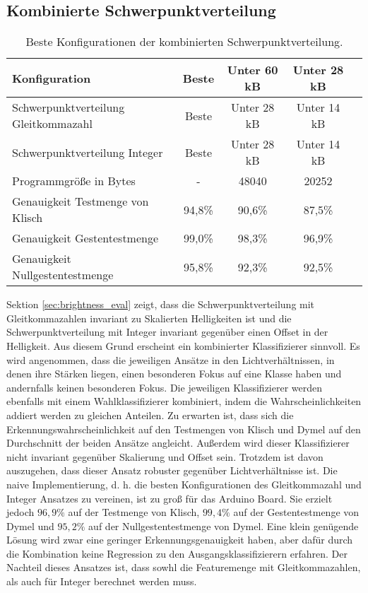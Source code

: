 \subsection{Kombinierte Schwerpunktverteilung}
\begin{table}[h!]
    \centering
    \begin{tabular}{ | l | c | c | c | c |}
        \hline
        Konfiguration & Beste & Unter 60 kB & Unter 28 kB \\\hline
        Schwerpunktverteilung Gleitkommazahl & Beste & Unter 28 kB & Unter 14 kB \\\hline
        Schwerpunktverteilung Integer & Beste &  Unter 28 kB & Unter 14 kB \\\hline
        Programmgröße in Bytes & - & 48040 & 20252 \\\hline
        Genauigkeit Testmenge von Klisch & 94,8\% & 90,6\% & 87,5\% \\\hline
        Genauigkeit Gestentestmenge & 99,0\% & 98,3\% & 96,9\% \\\hline
        Genauigkeit Nullgestentestmenge & 95,8\% & 92,3\% & 92,5\% \\\hline
    \end{tabular}
    \caption{Beste Konfigurationen der kombinierten Schwerpunktverteilung.}
    \label{tab:schwerpunktverteilung_int_and_float}
\end{table}
Sektion \ref{sec:brightness_eval} zeigt, dass die Schwerpunktverteilung mit Gleitkommazahlen invariant zu Skalierten Helligkeiten ist und die Schwerpunktverteilung mit Integer invariant
gegenüber einen Offset in der Helligkeit. Aus diesem Grund erscheint ein kombinierter Klassifizierer sinnvoll. Es wird angenommen, dass die jeweiligen Ansätze in den Lichtverhältnissen, in denen ihre
Stärken liegen, einen besonderen Fokus auf eine Klasse haben und andernfalls keinen besonderen Fokus.
\newline
\newline
Die jeweiligen Klassifizierer werden ebenfalls mit einem Wahlklassifizierer kombiniert, indem die Wahrscheinlichkeiten addiert werden zu gleichen Anteilen. Zu erwarten ist, dass sich die
Erkennungswahrscheinlichkeit auf den Testmengen von Klisch und Dymel auf den Durchschnitt der beiden Ansätze angleicht.
Außerdem wird dieser Klassifizierer nicht invariant gegenüber Skalierung und Offset sein. Trotzdem ist davon auszugehen, dass dieser Ansatz robuster gegenüber Lichtverhältnisse ist.
\newline
\newline
Die naive Implementierung, d. h. die besten Konfigurationen des Gleitkommazahl und Integer Ansatzes zu vereinen, ist zu groß für das Arduino Board. Sie erzielt jedoch $96,9\%$ auf der Testmenge
von Klisch, $99,4\%$ auf der Gestentestmenge von Dymel und $95,2\%$ auf der Nullgestentestmenge von Dymel. Eine klein genügende Lösung wird zwar eine geringer Erkennungsgenauigkeit haben, aber dafür
durch die Kombination keine Regression zu den Ausgangsklassifizierern erfahren.
\newline
\newline
Der Nachteil dieses Ansatzes ist, dass sowhl die Featuremenge mit Gleitkommazahlen, als auch für Integer berechnet werden muss.
